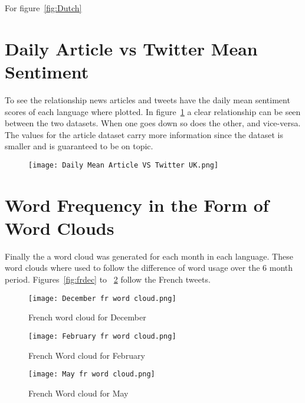 \noindent For figure~\ref{fig:Dutch}

\section{Daily Article vs Twitter Mean Sentiment}

To see the relationship news articles and tweets have the daily mean sentiment scores of each language where plotted.
In figure~\ref{fig:artcilevstwitter} a clear relationship can be seen between the two datasets.
When one goes down so does the other, and vice-versa.
The values for the article dataset carry more information since the dataset is smaller and is guaranteed to be on topic.

\begin{figure}[h!]
\texttt{[image: Daily Mean Article VS Twitter UK.png]}
\caption[Daily Mean Article VS Twitter]{ }
\label{fig:artcilevstwitter}
\end{figure}

\section{Word Frequency in the Form of Word Clouds}

Finally the a word cloud was generated for each month in each language.
These word clouds where used to follow the difference of word usage over the 6 month period.
Figures~\ref{fig:frdec} to ~\ref{fig:frmay} follow the French tweets.

\begin{figure}[!htb]
  \texttt{[image: December fr word cloud.png]}
  \caption{French word cloud for December}\label{fig:frdec}
\endminipage\hfill
{}
  \texttt{[image: February fr word cloud.png]}
  \caption{French Word cloud for February}\label{fig:frfeb}
\endminipage\hfill
{}
  \texttt{[image: May fr word cloud.png]}
  \caption{French Word cloud for May}\label{fig:frmay}
\endminipage
\end{figure}
